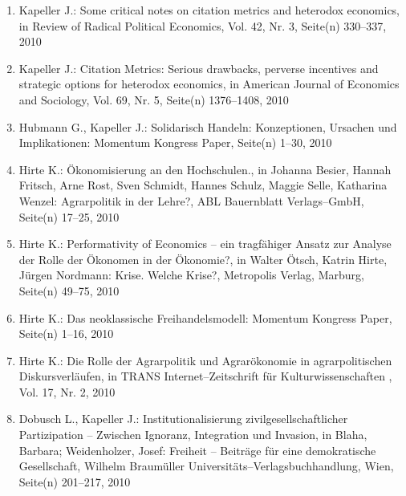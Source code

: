 \begin{enumerate}
	 \item Kapeller J.: Some critical notes on citation metrics and heterodox economics, in Review of Radical Political Economics, Vol. 42, Nr. 3, Seite(n) 330--337, 2010
	 \item Kapeller J.: Citation Metrics: Serious drawbacks, perverse incentives and strategic options for heterodox economics, in American Journal of Economics and Sociology, Vol. 69, Nr. 5, Seite(n) 1376--1408, 2010
	 \item Hubmann G., Kapeller J.: Solidarisch Handeln: Konzeptionen, Ursachen und Implikationen: Momentum Kongress Paper, Seite(n) 1--30, 2010
	 \item Hirte K.: Ökonomisierung an den Hochschulen., in Johanna Besier, Hannah Fritsch, Arne Rost, Sven Schmidt, Hannes Schulz, Maggie Selle, Katharina Wenzel: Agrarpolitik in der Lehre?, ABL Bauernblatt Verlags--GmbH, Seite(n) 17--25, 2010
	 \item Hirte K.: Performativity of Economics -- ein tragfähiger Ansatz zur Analyse der Rolle der Ökonomen in der Ökonomie?, in Walter Ötsch, Katrin Hirte, Jürgen Nordmann: Krise. Welche Krise?, Metropolis Verlag, Marburg, Seite(n) 49--75, 2010
	 \item Hirte K.: Das neoklassische Freihandelsmodell: Momentum Kongress Paper, Seite(n) 1--16, 2010
	 \item Hirte K.: Die Rolle der Agrarpolitik und Agrarökonomie in agrarpolitischen Diskursverläufen, in TRANS Internet--Zeitschrift für Kulturwissenschaften , Vol. 17, Nr. 2, 2010
	 \item Dobusch L., Kapeller J.: Institutionalisierung zivilgesellschaftlicher Partizipation -- Zwischen Ignoranz, Integration und Invasion, in Blaha, Barbara; Weidenholzer, Josef: Freiheit -- Beiträge für eine demokratische Gesellschaft, Wilhelm Braumüller Universitäts--Verlagsbuchhandlung, Wien, Seite(n) 201--217, 2010
\end{enumerate}
